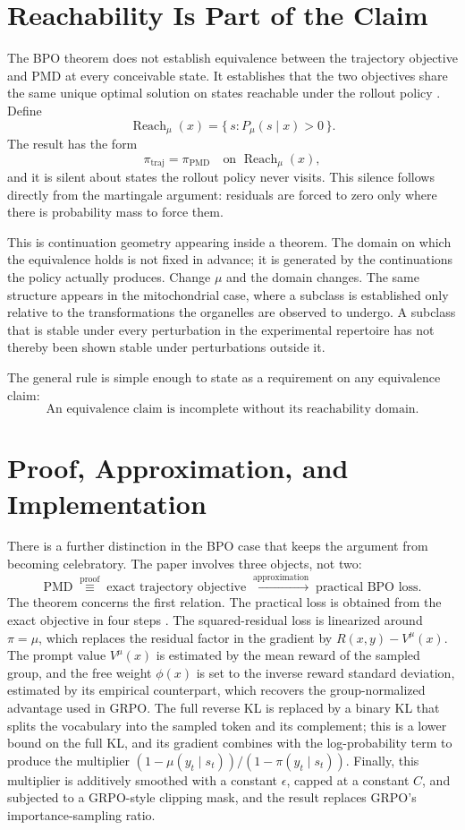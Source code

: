 \documentclass[11pt]{article}
\theoremstyle{remark}
\DeclareMathOperator{\Reach}{Reach}
\begin{document}
\section{Reachability Is Part of the Claim}

The BPO theorem does not establish equivalence between the trajectory objective and PMD at every conceivable state. It establishes that the two objectives share the same unique optimal solution on states reachable under the rollout policy \cite{bpo}. Define
\[
\Reach_\mu(x)=\{\,s : P_\mu(s\mid x)>0\,\}.
\]
The result has the form
\[
\pi_{\mathrm{traj}} = \pi_{\mathrm{PMD}}\quad\text{on }\Reach_\mu(x),
\]
and it is silent about states the rollout policy never visits. This silence follows directly from the martingale argument: residuals are forced to zero only where there is probability mass to force them.

This is continuation geometry appearing inside a theorem. The domain on which the equivalence holds is not fixed in advance; it is generated by the continuations the policy actually produces. Change $\mu$ and the domain changes. The same structure appears in the mitochondrial case, where a subclass is established only relative to the transformations the organelles are observed to undergo. A subclass that is stable under every perturbation in the experimental repertoire has not thereby been shown stable under perturbations outside it.

The general rule is simple enough to state as a requirement on any equivalence claim:
\[
\boxed{\text{An equivalence claim is incomplete without its reachability domain.}}
\]

\section{Proof, Approximation, and Implementation}

There is a further distinction in the BPO case that keeps the argument from becoming celebratory. The paper involves three objects, not two:
\[
\text{PMD}
\;\overset{\text{proof}}{\equiv}\;
\text{exact trajectory objective}
\;\overset{\text{approximation}}{\longrightarrow}\;
\text{practical BPO loss}.
\]
The theorem concerns the first relation. The practical loss is obtained from the exact objective in four steps \cite{bpo}. The squared-residual loss is linearized around $\pi=\mu$, which replaces the residual factor in the gradient by $R(x,y)-V^\mu(x)$. The prompt value $V^\mu(x)$ is estimated by the mean reward of the sampled group, and the free weight $\phi(x)$ is set to the inverse reward standard deviation, estimated by its empirical counterpart, which recovers the group-normalized advantage used in GRPO. The full reverse KL is replaced by a binary KL that splits the vocabulary into the sampled token and its complement; this is a lower bound on the full KL, and its gradient combines with the log-probability term to produce the multiplier $(1-\mu(y_t\mid s_t))/(1-\pi(y_t\mid s_t))$. Finally, this multiplier is additively smoothed with a constant $\epsilon$, capped at a constant $C$, and subjected to a GRPO-style clipping mask, and the result replaces GRPO's importance-sampling ratio.
\end{document}
